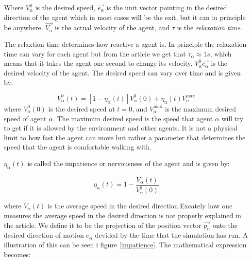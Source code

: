 Where $V_{\alpha}^{0}$ is the desired speed, $ \overrightarrow{e_{\alpha}} $ is the unit 
vector pointing in the desired direction of the agent which in most cases will 
be the exit, but it can in principle be anywhere.  $\overrightarrow{V_{\alpha}}$ is the 
actual velocity of the agent, and $\tau$ is the \emph{relaxation time}.

The relaxtion time determines how reactive a agent is. In principle the 
relaxation time can vary for each agent but from the article \cite{self-org} 
we get that $ \tau_{\alpha}\approx 1s $, which means that it takes the agent 
one second to change its velocity. $V_{\alpha}^{0} \overrightarrow{e_{\alpha}}$ is the desired 
velocity of the agent. The desired speed can vary over time and is given by:

\begin{equation}\label{v0eta}
    V_{\alpha}^{0}\left( t \right) = \left[ 1 - \eta_{\alpha} \left( t \right) \right] 
    V_{\alpha}^{0} \left( 0 \right) +
    \eta_{\alpha} \left( t \right)V_{\alpha}^{\text{max}}
\end{equation}
where $V_{\alpha}^{0} \left( 0 \right)$ is the desired speed at $ t=0 $, and 
$V_{\alpha}^{\text{max}}$ is the maximum desired speed of agent $\alpha$. The 
maximum desired speed is the speed that agent $\alpha$ will try to get if it 
is allowed by the environment and other agents. It is not a physical limit to 
how fast the agent can move but rather a parameter that determines the speed 
that the agent is comfortable walking with. 

$\eta_{\alpha} \left( t \right)$ is called the impatience or nervousness of 
the agent and is given by:

\begin{equation}\label{eta}
	\eta_{\alpha} \left( t \right) =
    1 - \frac{\overline{V}_{\alpha} \left( t \right)}
             {V_{\alpha}^{0} \left( 0 \right)}
\end{equation}

where $\overline{V}_{\alpha}\left( t \right)$ is the average speed in the 
desired direction.Excately how one measures the average speed in the desired 
direction is not properly explained in the article. We define it to be the 
projection of the position vector $ \overrightarrow{p_{\alpha}} $ onto the desired direction 
of motion $e_{\alpha}$ devided by the time that the simulation has run. A 
illustration of this can be seen i figure \ref{impatience}. The mathematical 
expression becomes:

